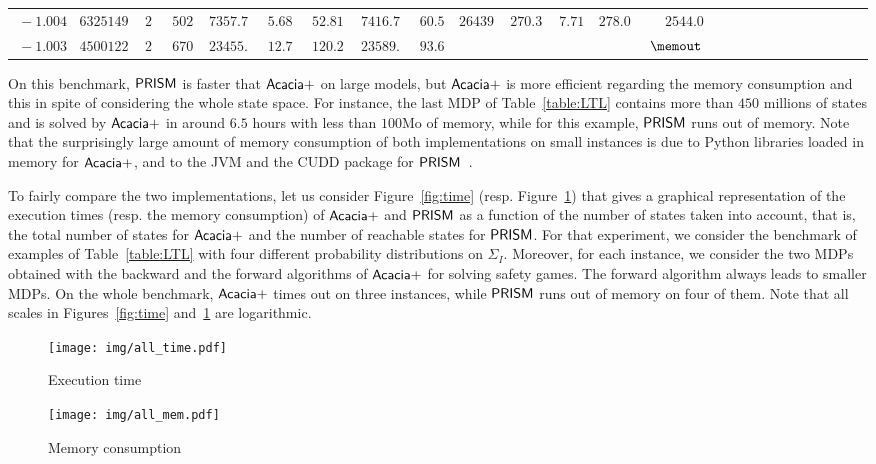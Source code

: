 \begin{table}[h!]
\begin{tabular}{|r||r|r|r|r|r|r|r|r||r|r|r|r|r|r|r|r|r|r|r|r|r|r|r|r|}
$\ -1.004\ $ & $\ 63251499\ $ & $\ 2\ $ & $\ 502\ $ & $\ 7357.72\ $ & $\ 5.68\ $ & $\ 52.81\ $  & $\ 7416.77\ $ & $\ 60.5\ $ & $\ 264391\ $ & $\ 270.30\ $ & $\ 7.71\ $  & $\ 278.01\ $ & $\ 2544.0\ $\rule[-3pt]{0pt}{10pt}\\
$\ -1.003\ $ & $\ 450012211\ $ & $\ 2\ $ & $\ 670\ $ & $\ 23455.44\ $ & $\ 12.72\ $ & $\ 120.25\ $  & $\ 23589.49\ $ & $\ 93.6\ $ & $\ \ $ & $\ \ $ & $\ \ $  & $\ \ $ & $\ \memout\ $\rule[-3pt]{0pt}{10pt}\\
\hline
	\end{tabular}
	\normalsize
\end{table}

On this benchmark, $\sf{PRISM}$ is faster that $\sf{Acacia+}$ on large models, but $\sf{Acacia+}$ is more efficient regarding the memory consumption and this in spite of considering the whole state space. For instance, the last MDP of Table~\ref{table:LTL} contains more than $450$ millions of states and is solved by $\sf{Acacia+}$ in around $6.5$ hours with less than $100$Mo of memory, while for this example, $\sf{PRISM}$ runs out of memory. Note that the surprisingly large amount of memory consumption of both implementations on small instances is due to Python libraries loaded in memory for $\sf{Acacia+}$, and to the JVM and the CUDD package for $\sf{PRISM}$~\cite{DBLP:conf/hvc/JansenKOSZ07}.

To fairly compare the two implementations, let us consider Figure~\ref{fig:time} (resp. Figure~\ref{fig:memory}) that gives a graphical representation of the execution times (resp.  the memory consumption) of $\sf{Acacia+}$ and $\sf{PRISM}$ as a function of the number of states taken into account, that is, the total number of states for $\sf{Acacia+}$ and the number of reachable states for $\sf{PRISM}$. For that experiment, we consider the benchmark of examples of Table~\ref{table:LTL} with four different probability distributions on $\Sigma_I$. Moreover, for each instance, we consider the two MDPs obtained with the backward and the forward algorithms of $\sf{Acacia+}$ for solving safety games. The forward algorithm always leads to smaller MDPs. On the whole benchmark, $\sf{Acacia+}$ times out on three instances, while $\sf{PRISM}$ runs out of memory on four of them. Note that all scales in Figures~\ref{fig:time} and~\ref{fig:memory} are logarithmic.


\begin{figure}[!h]
   \begin{minipage}[t]{.48\linewidth}
	\texttt{[image: img/all\_time.pdf]}
	\caption{Execution time}
	\label{fig:time}   
\end{minipage} \hfill
   \begin{minipage}[t]{.48\linewidth}
	\texttt{[image: img/all\_mem.pdf]}
	\caption{Memory consumption}
	\label{fig:memory}  
 \end{minipage}
\end{figure}


